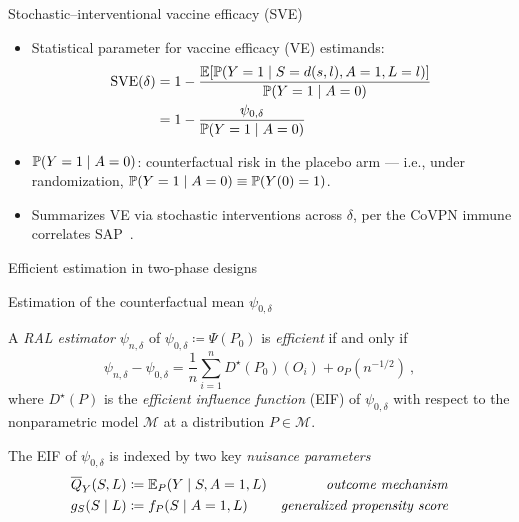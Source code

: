 \documentclass{beamer}
\begin{document}
\begin{frame}[c]{Stochastic--interventional vaccine efficacy (SVE)}

\begin{center}
\begin{itemize}
  \itemsep8pt
  \item Statistical parameter for vaccine efficacy (VE) estimands:
  \begin{align*}
    \text{SVE}(\delta) &= 1 - \frac{\mathbb{E}[\mathbb{P}(Y = 1 \mid S = d(s, l), A = 1,
                                    L = l)]}{\mathbb{P}(Y=1 \mid A=0)} \\
                       &= 1 - \frac{\psi_{0, \delta}}{\mathbb{P}(Y=1 \mid A=0)}
  \end{align*}
  \item $\mathbb{P}(Y=1 \mid A=0)$: counterfactual risk in the placebo arm --- i.e.,
     under randomization, $\mathbb{P}(Y=1 \mid A=0) \equiv \mathbb{P}(Y(0)=1)$.
  \item Summarizes VE via stochastic interventions across $\delta$, per the
    CoVPN immune correlates SAP\footnotemark~\citep{gilbert2021covpn,
    gilbert2021immune}.
\end{itemize}
\end{center}

\note{
}


\end{frame}


\begin{frame}[standout]
  Efficient estimation in two-phase designs
\end{frame}


\begin{frame}{Estimation of the counterfactual mean $\psi_{0,\delta}$}

A \textit{RAL estimator} $\psi_{n,\delta}$ of $\psi_{0,\delta} \coloneqq
\Psi(P_0)$ is \textit{efficient} if and only if
\[
  \psi_{n,\delta} - \psi_{0, \delta} = \frac{1}{n} \sum\limits_{i=1}^n
  D^{\star}(P_0)(O_i) + o_P(n^{-1/2}) \ ,
\]
where $D^{\star}(P)$ is the \textit{efficient influence function} (EIF) of
$\psi_{0,\delta}$ with respect to the nonparametric model $\mathcal{M}$ at a
distribution $P \in \mathcal{M}$.
\vspace{0.25cm}

The EIF of $\psi_{0,\delta}$ is indexed by two key \textit{nuisance parameters}
\begin{align*}
  \overline{Q}_{Y}(S,L) &\coloneqq \mathbb{E}_{P}(Y \mid S, A = 1, L) &
      \mbox{\textit{outcome mechanism}} \\
  g_{S}(S \mid L) &\coloneqq f_P(S \mid A = 1, L) &
    \mbox{\textit{generalized propensity score}}
\end{align*}

\note{
}

\end{frame}
\end{document}
